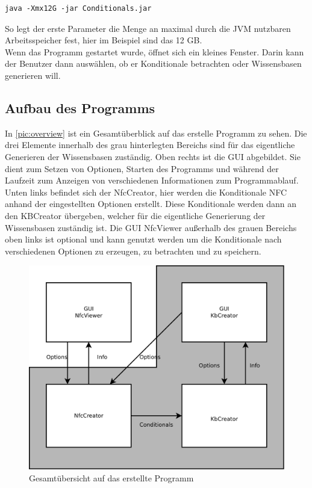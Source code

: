 \documentclass[12pt,a4paper]{article}
\begin{document}
\begin{lstlisting}
java -Xmx12G -jar Conditionals.jar 
\end{lstlisting}

So legt der erste Parameter die Menge an maximal durch die JVM nutzbaren Arbeitsspeicher fest, hier im Beispiel sind das 12 GB. \\
Wenn das Programm gestartet wurde, öffnet sich ein kleines Fenster. Darin kann der Benutzer dann  auswählen, ob er Konditionale betrachten oder Wissensbasen generieren will.






\subsection{Aufbau des Programms}


In \autoref{pic:overview} ist ein Gesamtüberblick auf das erstelle Programm zu sehen. Die drei Elemente innerhalb des grau hinterlegten Bereichs sind für das eigentliche Generieren der Wissensbasen zuständig. Oben rechts ist die GUI abgebildet. Sie dient zum Setzen von Optionen, Starten des Programms und während der Laufzeit zum Anzeigen von verschiedenen Informationen zum Programmablauf. Unten links befindet sich der NfcCreator, hier werden die Konditionale NFC anhand der eingestellten Optionen erstellt. Diese Konditionale werden dann an den KBCreator übergeben, welcher für die eigentliche Generierung der Wissensbasen zuständig ist. Die GUI NfcViewer außerhalb des grauen Bereichs oben links ist optional und kann genutzt werden um die Konditionale nach verschiedenen Optionen zu erzeugen, zu betrachten und zu speichern.

\begin{figure}
\includegraphics[width=0.7\linewidth]{bilder/overview.png}

\caption{Gesamtübersicht auf das erstellte Programm}
\label{pic:overview}
\end{figure}
\end{document}
